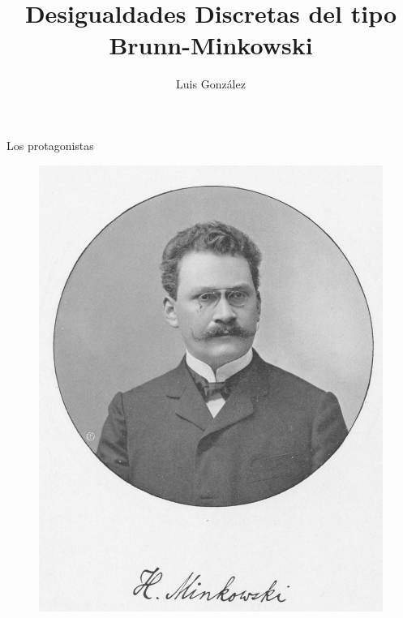 \documentclass{beamer}
\title{Desigualdades Discretas del tipo Brunn-Minkowski}
\author{Luis González}
\institute{Instituto de Matemáticas - UNAM}
\begin{document}
\maketitle

\begin{frame}{Los protagonistas}
    \begin{figure}
\begin{multicols}{2}
    \includegraphics[width=\linewidth]{pics/minkowski.jpg}\par 

\end{multicols}
\end{figure}
\end{frame}
\end{document}
